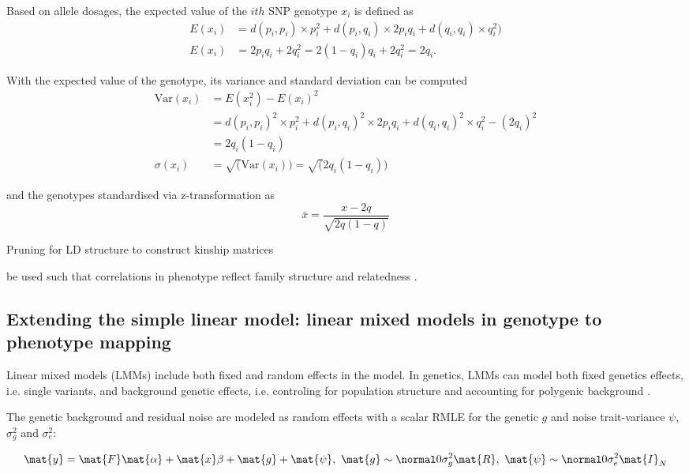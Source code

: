 Based on allele dosages, the expected value of the \(ith\) SNP genotype \(x_i\) is defined as 
\begin{align}
E(x_i) &=  d(p_i,p_i) \times p_i^2 + d(p_i,q_i) \times 2p_iq_i + d(q_i,q_i) \times  q_i^2) \\
E(x_i) &= 2p_iq_i + 2q_i^2 = 2(1-q_i)q_i + 2q_i^2 = 2q_i.
\end{align}

With the expected value of the genotype, its variance and standard deviation can be computed
\begin{align}
\text{Var}(x_i) &= E(x_i^2) - E(x_i)^2 \\
&= d(p_i,p_i)^2 \times  p_i^2 + d(p_i,q_i)^2  \times 2p_iq_i + d(q_i,q_i)^2  \times q_i^2 - (2q_i)^2 \\
&=  2q_i(1-q_i) \\
\sigma(x_i) &= \sqrt(\text{Var}(x_i)) = \sqrt(2q_i(1-q_i))
\end{align}

and the genotypes standardised  via z-transformation as
\begin{equation}
\bar{x} = \frac{x - 2q}{\sqrt{2q(1-q)}}
\end{equation}

Pruning for LD structure to construct kinship matrices \citep{Eu-ahsunthornwattana2014}

 be used such that correlations in phenotype reflect family structure and relatedness \citep{Yu2006,Kang2008}.


\subsection{Extending the simple linear model: linear mixed models in genotype to phenotype mapping}
\label{subection:lmm}
Linear mixed models (LMMs) include both fixed and random effects in the model. In genetics, LMMs can model both fixed genetics effects, i.e. single variants, and background genetic effects, i.e. controling for population structure and accounting for polygenic background \citep{Yu2006}. 

The genetic background and residual noise are modeled as random effects with a scalar RMLE for the genetic \(g\) and noise trait-variance \(\psi\),   \(\sigma_g^2\) and \(\sigma_e^2\):

\begin{equation}
\mat{y} =\mat{F}\mat{\alpha} +\mat{x}\beta +\mat{g}+\mat{\psi},\text{ }
\mat{g} \sim \normal 0 {\sigma_g^2\mat{R}},\text{ }
\mat{\psi} \sim\normal 0 {\sigma_e^2\mat{I}_N}
\label{eq:lmm-uv}
\end{equation}

